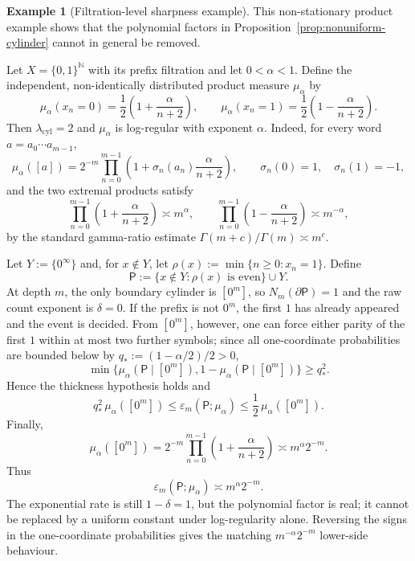 \documentclass{etds}%
\numberwithin{equation}{section}
\theoremstyle{plain}
\theoremstyle{definition}
\newtheorem{example}[theorem]{Example}
\theoremstyle{remark}
\newcommand{\NN}{\mathbb{N}}
\begin{document}
\begin{example}[Filtration-level sharpness example]
\label{ex:log-regular-polynomial-correction}
This non-stationary product example shows that the polynomial factors in
Proposition~\ref{prop:nonuniform-cylinder} cannot in general be removed.

Let $X=\{0,1\}^{\NN}$ with its prefix filtration and let
$0<\alpha<1$.  Define the independent, non-identically distributed product
measure $\mu_\alpha$ by
\[
\mu_\alpha(x_n=0)=\frac12\left(1+\frac{\alpha}{n+2}\right),
\qquad
\mu_\alpha(x_n=1)=\frac12\left(1-\frac{\alpha}{n+2}\right).
\]
Then $\lambda_{\mathrm{cyl}}=2$ and $\mu_\alpha$ is log-regular with exponent
$\alpha$.  Indeed, for every word
$a=a_0\cdots a_{m-1}$,
\[
\mu_\alpha([a])=2^{-m}\prod_{n=0}^{m-1}
\left(1+\sigma_n(a_n)\frac{\alpha}{n+2}\right),
\qquad \sigma_n(0)=1,\quad \sigma_n(1)=-1,
\]
and the two extremal products satisfy
\[
\prod_{n=0}^{m-1}\left(1+\frac{\alpha}{n+2}\right)\asymp m^\alpha,
\qquad
\prod_{n=0}^{m-1}\left(1-\frac{\alpha}{n+2}\right)\asymp m^{-\alpha},
\]
by the standard gamma-ratio estimate
$\Gamma(m+c)/\Gamma(m)\asymp m^c$.

Let $Y:=\{0^\infty\}$ and, for $x\notin Y$, let
$\rho(x):=\min\{n\ge 0:x_n=1\}$.  Define
\[
\mathsf{P}:=\{x\notin Y:\rho(x)\text{ is even}\}\cup Y.
\]
At depth $m$, the only boundary cylinder is $[0^m]$, so
$N_m(\partial\mathsf{P})=1$ and the raw count exponent is $\delta=0$.  If the
prefix is not $0^m$, the first $1$ has already appeared and the event is
decided.  From $[0^m]$, however, one can force either parity of the first $1$
within at most two further symbols; since all one-coordinate probabilities are
bounded below by $q_*:=(1-\alpha/2)/2>0$,
\[
\min\{\mu_\alpha(\mathsf{P}\mid[0^m]),
1-\mu_\alpha(\mathsf{P}\mid[0^m])\}\ge q_*^2.
\]
Hence the thickness hypothesis holds and
\[
q_*^2\,\mu_\alpha([0^m])
\le \varepsilon_m(\mathsf{P};\mu_\alpha)
\le \frac12\,\mu_\alpha([0^m]).
\]
Finally,
\[
\mu_\alpha([0^m])
=2^{-m}\prod_{n=0}^{m-1}\left(1+\frac{\alpha}{n+2}\right)
\asymp m^\alpha 2^{-m}.
\]
Thus
\[
\varepsilon_m(\mathsf{P};\mu_\alpha)\asymp m^\alpha 2^{-m}.
\]
The exponential rate is still $1-\delta=1$, but the polynomial factor is
real; it cannot be replaced by a uniform constant under log-regularity alone.
Reversing the signs in the one-coordinate probabilities gives the matching
$m^{-\alpha}2^{-m}$ lower-side behaviour.
\end{example}



\end{document}
